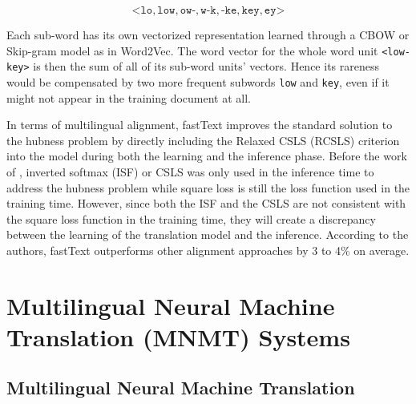 \documentclass[thesis,fonts=libertine]{cluu}
\begin{document}
\begin{equation*}
  \mathtt{\text{<}lo, low, ow\text{-}, w\text{-}k, \text{-}ke, key, ey\text{>}}
\end{equation*}

Each sub-word has its own vectorized representation learned through a CBOW or Skip-gram model as in Word2Vec. The word vector for the whole word unit \texttt{<low-key>} is then the sum of all of its sub-word units' vectors. Hence its rareness would be compensated by two more frequent subwords \texttt{low} and \texttt{key}, even if it might not appear in the training document at all.

In terms of multilingual alignment, fastText improves the standard solution to the hubness problem by directly including the Relaxed CSLS (RCSLS) criterion into the model during both the learning and the inference phase. Before the work of \cite{Joulin:2018aa}, inverted softmax (ISF) \cite{Smith:2017aa} or CSLS \parencite{Conneau:2017aa} was only used in the inference time to address the hubness problem while square loss is still the loss function used in the training time. However, since both the ISF and the CSLS are not consistent with the square loss function in the training time, they will create a discrepancy between the learning of the translation model and the inference. According to the authors, fastText outperforms other alignment approaches by 3 to 4\% on average.

\section{Multilingual Neural Machine Translation (MNMT) Systems}

\subsection{Multilingual Neural Machine Translation}
\end{document}
